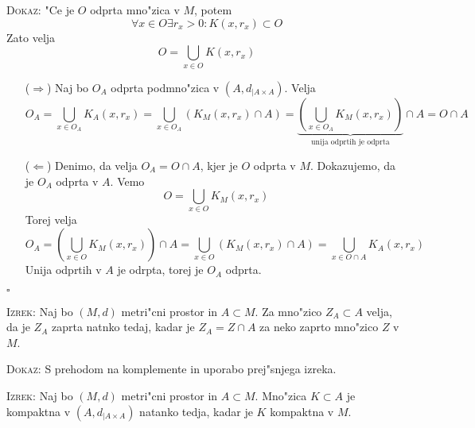 \textsc{Dokaz:} "Ce je $O$ odprta mno"zica v $M$, potem
\begin{equation*}
\forall x \in O \exists r_x > 0: K(x, r_x) \subset O
\end{equation*}
Zato velja
\begin{equation*}
O = \bigcup_{x \in O} K(x, r_x)
\end{equation*}
\begin{itemize}
    \item[($\Rightarrow$)] Naj bo $O_A$ odprta podmno"zica v $(A, d_{|A \times A})$. Velja
    \begin{equation*}
    O_A = \bigcup_{x \in O_A} K_A(x, r_x) = \bigcup_{x \in O_A} \left( K_M(x, r_x) \cap A \right) = \underbrace{\left( \bigcup_{x \in O_A} K_M(x, r_x) \right)}_\text{unija odprtih je odprta} \cap A = O \cap A
    \end{equation*}
    
    \item[($\Leftarrow$)] Denimo, da velja $O_A = O \cap A$, kjer je $O$ odprta v $M$. Dokazujemo, da je $O_A$ odprta v $A$. Vemo
    \begin{equation*}
    O = \bigcup_{x \in O} K_M(x, r_x)
    \end{equation*}
    Torej velja
    \begin{equation*}
    O_A = \left( \bigcup_{x \in O} K_M(x, r_x) \right) \cap A = \bigcup_{x \in O} \left( K_M(x, r_x) \cap A \right) = \bigcup_{x \in O \cap A} K_A(x, r_x)
    \end{equation*}
    Unija odprtih v $A$ je odrpta, torej je $O_A$ odprta.
\end{itemize}
\hfill $\square$

\textsc{Izrek:} Naj bo $(M, d)$ metri"cni prostor in $A \subset M$. Za mno"zico $Z_A \subset A$ velja, da je $Z_A$ zaprta natnko tedaj, kadar je $Z_A = Z \cap A$ za neko zaprto mno"zico $Z$ v $M$.

\textsc{Dokaz:} S prehodom na komplemente in uporabo prej"snjega izreka.

\textsc{Izrek:} Naj bo $(M, d)$ metri"cni prostor in $A \subset M$. Mno"zica $K \subset A$ je kompaktna v $(A, d_{|A \times A})$ natanko tedja, kadar je $K$ kompaktna v $M$.

